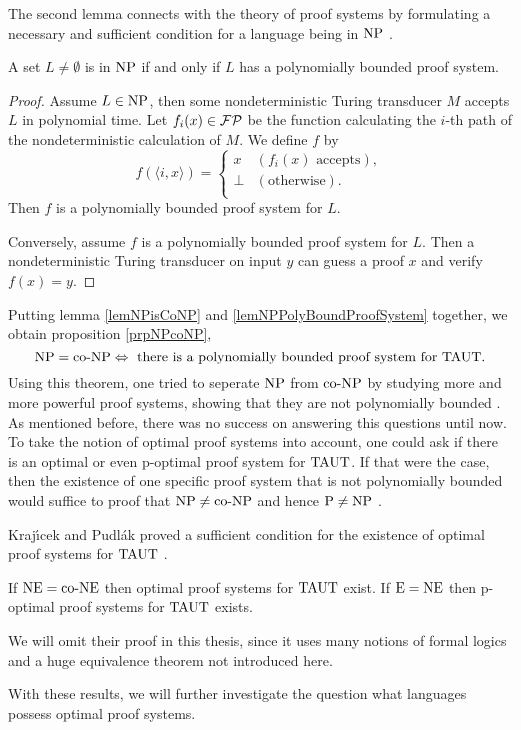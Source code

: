   The second lemma connects with the theory of proof systems by formulating a necessary and sufficient condition for a language being in \(\text{NP}\) \cite{CR79}.

  \begin{lemma} \label{lemNPPolyBoundProofSystem}
    A set \(L \neq \emptyset\) is in \(\text{NP}\) if and only if \(L\) has a polynomially bounded proof system.
  \end{lemma}

  \begin{proof}
   Assume \(L \in \text{NP}\), then some nondeterministic Turing transducer \(M\) accepts \(L\) in polynomial time. Let \(f_i(x) \in \mathcal{FP}\) be the function calculating the \(i\)-th path of the nondeterministic calculation of \(M\). We define \(f\) by
   \[
     f(\langle i, x \rangle) =
     \begin{cases}
       x & (f_i(x) \text{ accepts}), \\
       \perp & (\text{otherwise}). \\
     \end{cases}
   \]
   Then \(f\) is a polynomially bounded proof system for \(L\).

   Conversely, assume \(f\) is a polynomially bounded proof system for \(L\). Then a nondeterministic Turing transducer on input \(y\) can guess a proof \(x\) and verify \(f(x) = y\).
  \end{proof}

  Putting lemma \ref{lemNPisCoNP} and \ref{lemNPPolyBoundProofSystem} together, we obtain proposition \ref{prpNPcoNP},
  \[
    \text{NP} = \text{co-NP} \Leftrightarrow \text{ there is a polynomially bounded proof system for } \text{TAUT}.
  \]
  Using this theorem, one tried to seperate \(\text{NP}\) from \(\text{co-NP}\) by studying more and more powerful proof systems, showing that they are not polynomially bounded \cite{KMT03}. As mentioned before, there was no success on answering this questions until now. To take the notion of optimal proof systems into account, one could ask if there is an optimal or even p-optimal proof system for \(\text{TAUT}\). If that were the case, then the existence of one specific proof system that is not polynomially bounded would suffice to proof that \(\text{NP} \neq \text{co-NP}\) and hence \(\text{P} \neq \text{NP}\) \cite{KMT03}.

  Kraj\'{\i}cek and Pudl{\'a}k proved a sufficient condition for the existence of optimal proof systems for \(\text{TAUT}\) \cite{KP89}.

  \begin{theorem}
    If \(\text{NE} = \text{co-NE}\) then optimal proof systems for \(\text{TAUT}\) exist. If \(\text{E} = \text{NE}\) then p-optimal proof systems for \(\text{TAUT}\) exists.
  \end{theorem}

  We will omit their proof in this thesis, since it uses many notions of formal logics and a huge equivalence theorem not introduced here.

  With these results, we will further investigate the question what languages possess optimal proof systems.





  